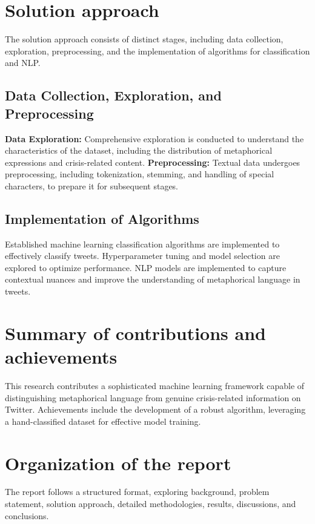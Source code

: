 \section{Solution approach}
\label{sec:intro_sol} %
The solution approach consists of distinct stages, including data collection, exploration, preprocessing, and the implementation of algorithms for classification and NLP.

\subsection{Data Collection, Exploration, and Preprocessing}
\label{sec:intro_some_sub1}
\textbf{Data Exploration:} Comprehensive exploration is conducted to understand the characteristics of the dataset, including the distribution of metaphorical expressions and crisis-related content.
\textbf{Preprocessing:} Textual data undergoes preprocessing, including tokenization, stemming, and handling of special characters, to prepare it for subsequent stages. 

\subsection{Implementation of Algorithms}
\label{sec:intro_some_sub2}
 Established machine learning classification algorithms are implemented to effectively classify tweets. Hyperparameter tuning and model selection are explored to optimize performance.
NLP models are implemented to capture contextual nuances and improve the understanding of metaphorical language in tweets.


\section{Summary of contributions and achievements} %
\label{sec:intro_sum_results} %
This research contributes a sophisticated machine learning framework capable of distinguishing metaphorical language from genuine crisis-related information on Twitter. Achievements include the development of a robust algorithm, leveraging a hand-classified dataset for effective model training.


\section{Organization of the report} %
\label{sec:intro_org} %
The report follows a structured format, exploring background, problem statement, solution approach, detailed methodologies, results, discussions, and conclusions.
